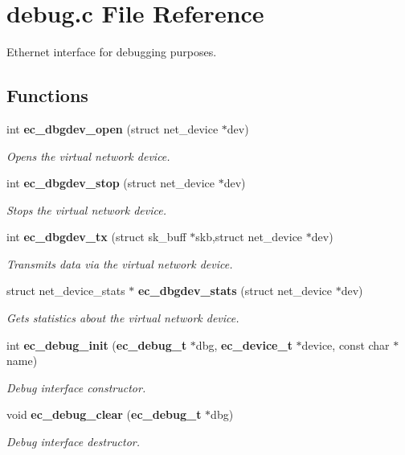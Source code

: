 \section{debug.\-c \-File \-Reference}
\label{debug_8c}


\-Ethernet interface for debugging purposes.  


\subsection*{\-Functions}
\begin{DoxyCompactItemize}
\item 
int {\bf ec\-\_\-dbgdev\-\_\-open} (struct net\-\_\-device $\ast$dev)
\begin{DoxyCompactList}\small\item\em \-Opens the virtual network device. \end{DoxyCompactList}\item 
int {\bf ec\-\_\-dbgdev\-\_\-stop} (struct net\-\_\-device $\ast$dev)
\begin{DoxyCompactList}\small\item\em \-Stops the virtual network device. \end{DoxyCompactList}\item 
int {\bf ec\-\_\-dbgdev\-\_\-tx} (struct sk\-\_\-buff $\ast$skb,struct net\-\_\-device $\ast$dev)
\begin{DoxyCompactList}\small\item\em \-Transmits data via the virtual network device. \end{DoxyCompactList}\item 
struct net\-\_\-device\-\_\-stats $\ast$ {\bf ec\-\_\-dbgdev\-\_\-stats} (struct net\-\_\-device $\ast$dev)
\begin{DoxyCompactList}\small\item\em \-Gets statistics about the virtual network device. \end{DoxyCompactList}\item 
int {\bf ec\-\_\-debug\-\_\-init} ({\bf ec\-\_\-debug\-\_\-t} $\ast$dbg, {\bf ec\-\_\-device\-\_\-t} $\ast$device, const char $\ast$name)
\begin{DoxyCompactList}\small\item\em \-Debug interface constructor. \end{DoxyCompactList}\item 
void {\bf ec\-\_\-debug\-\_\-clear} ({\bf ec\-\_\-debug\-\_\-t} $\ast$dbg)
\begin{DoxyCompactList}\small\item\em \-Debug interface destructor. \end{DoxyCompactList}\item 

\end{DoxyCompactItemize}
